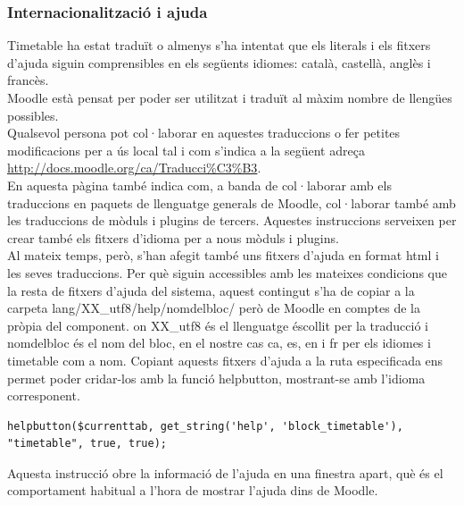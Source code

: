 \documentclass[a4paper]{report}  %
\begin{document}
\subsubsection{Internacionalització i ajuda}
Timetable ha estat traduït o almenys s'ha intentat que els literals i els fitxers d'ajuda siguin comprensibles en els següents idiomes: català, castellà, anglès i francès.\\
Moodle està pensat per poder ser utilitzat i traduït al màxim nombre de llengües possibles.\\ 
Qualsevol persona pot col·laborar en aquestes traduccions o fer petites modificacions per a ús local tal i com s'indica a la següent adreça \url{http://docs.moodle.org/ca/Traducci%C3%B3}.\\
En aquesta pàgina també indica com, a banda de col·laborar amb els traduccions en paquets de llenguatge generals de Moodle, col·laborar també amb les traduccions de mòduls i plugins de tercers. 
Aquestes instruccions serveixen per crear també els fitxers d'idioma per a nous mòduls i plugins.\\
Al mateix temps, però, s'han afegit també uns fitxers d'ajuda en format html i les seves traduccions. 
Per què siguin accessibles amb les mateixes condicions que la resta de fitxers d'ajuda del sistema, aquest contingut s'ha de copiar a la carpeta lang/XX\_utf8/help/nomdelbloc/  però de Moodle en comptes de la pròpia del component. on XX\_utf8 és el llenguatge éscollit per la traducció i nomdelbloc és el nom del bloc, en el nostre cas ca, es, en i fr per els idiomes i timetable com a nom.
Copiant aquests fitxers d'ajuda a la ruta especificada ens permet poder cridar-los amb la funció helpbutton, mostrant-se amb l'idioma corresponent.
\begin{lstlisting}[style=PHP,caption=Crida als fitxers d'ajuda on \$currenttab és el nom del fitxer.]
helpbutton($currenttab, get_string('help', 'block_timetable'), "timetable", true, true);
\end{lstlisting}
Aquesta instrucció obre la informació de l'ajuda en una finestra apart, què és el comportament habitual a l'hora de mostrar l'ajuda dins de Moodle.
\end{document}
